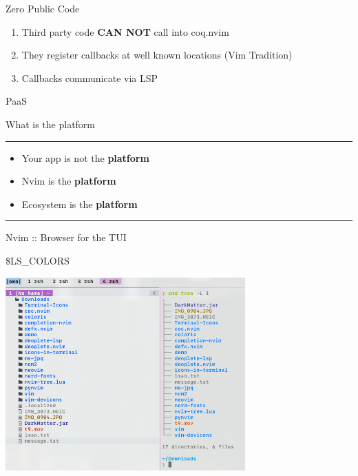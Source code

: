 \documentclass{beamer}
\begin{document}
\begin{frame}{Zero Public Code}

	\begin{enumerate}

		\item Third party code \textbf{CAN NOT} call into coq.nvim

		\item They register callbacks at well known locations (Vim Tradition)

		\item Callbacks communicate via LSP

	\end{enumerate}

\end{frame}


\begin{frame}{PaaS}

	What is the platform

	\rule{\textwidth}{0.1em}

	\begin{itemize}

		\item Your app is not the \textbf{platform}

		\item Nvim is the \textbf{platform}

		\item Ecosystem is the \textbf{platform}

	\end{itemize}

	\rule{\textwidth}{0.1em}

	Nvim :: Browser for the TUI

\end{frame}


\begin{frame}{\$LS\_COLORS}

	\includegraphics[width=\textwidth,height=20em]{chadtree_ls}

\end{frame}
\end{document}
